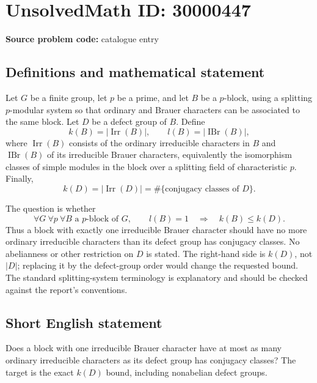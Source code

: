 \documentclass[11pt]{article}
\begin{document}
\section*{UnsolvedMath ID: 30000447}
\textbf{Source problem code:} catalogue entry
\subsection{Definitions and mathematical statement}
Let $G$ be a finite group, let $p$ be a prime, and let $B$ be a $p$-block, using a splitting $p$-modular system so that ordinary and Brauer characters can be associated to the same block. Let $D$ be a defect group of $B$. Define
\[
 k(B)=|\operatorname{Irr}(B)|,\qquad
 l(B)=|\operatorname{IBr}(B)|,
\]
where $\operatorname{Irr}(B)$ consists of the ordinary irreducible characters in $B$ and $\operatorname{IBr}(B)$ of its irreducible Brauer characters, equivalently the isomorphism classes of simple modules in the block over a splitting field of characteristic $p$. Finally,
\[
 k(D)=|\operatorname{Irr}(D)|
      =\#\{\text{conjugacy classes of }D\}.
\]

The question is whether
\[
 \forall G\ \forall p\ \forall B\text{ a }p\text{-block of }G,
 \qquad l(B)=1\quad\Longrightarrow\quad k(B)\le k(D).
\]
Thus a block with exactly one irreducible Brauer character should have no more ordinary irreducible characters than its defect group has conjugacy classes. No abelianness or other restriction on $D$ is stated. The right-hand side is $k(D)$, not $|D|$; replacing it by the defect-group order would change the requested bound. The standard splitting-system terminology is explanatory and should be checked against the report's conventions.
\subsection{Short English statement}
Does a block with one irreducible Brauer character have at most as many ordinary irreducible characters as its defect group has conjugacy classes? The target is the exact $k(D)$ bound, including nonabelian defect groups.
\end{document}
